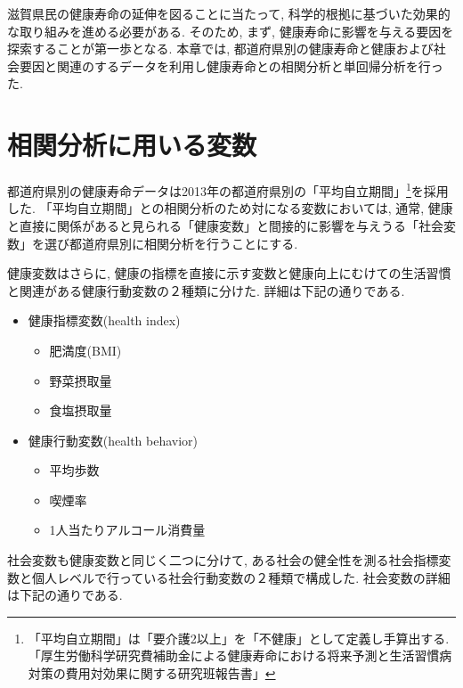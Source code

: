 滋賀県民の健康寿命の延伸を図ることに当たって, 科学的根拠に基づいた効果的な取り組みを進める必要がある. そのため, まず, 健康寿命に影響を与える要因を探索することが第一歩となる.
本章では, 都道府県別の健康寿命と健康および社会要因と関連のするデータを利用し健康寿命との相関分析と単回帰分析を行った.

\section{相関分析に用いる変数}
都道府県別の健康寿命データは2013年の都道府県別の「平均自立期間」\footnote{「平均自立期間」は「要介護2以上」を「不健康」として定義し手算出する. 「厚生労働科学研究費補助金による健康寿命における将来予測と生活習慣病対策の費用対効果に関する研究班報告書」}を採用した. 「平均自立期間」との相関分析のため対になる変数においては, 通常, 健康と直接に関係があると見られる「健康変数」と間接的に影響を与えうる「社会変数」を選び都道府県別に相関分析を行うことにする.

健康変数はさらに, 健康の指標を直接に示す変数と健康向上にむけての生活習慣と関連がある健康行動変数の２種類に分けた. 詳細は下記の通りである.
\begin{itemize} \setlength{\itemsep}{-0.5mm} \setlength{\parskip}{-0.5mm}
	\item 健康指標変数(health index)
	      \begin{itemize} \setlength{\itemsep}{-0.5mm} \setlength{\parskip}{-0.5mm}
		      \item 	肥満度(BMI)
		      \item 	野菜摂取量
		      \item 	食塩摂取量
	      \end{itemize}

	\item 健康行動変数(health behavior)
	      \begin{itemize} \setlength{\itemsep}{-0.5mm} \setlength{\parskip}{-0.5mm}
		      \item 	平均歩数
		      \item 	喫煙率
		      \item 	1人当たりアルコール消費量
	      \end{itemize}
\end{itemize}

社会変数も健康変数と同じく二つに分けて, ある社会の健全性を測る社会指標変数と個人レベルで行っている社会行動変数の２種類で構成した. 社会変数の詳細は下記の通りである.

